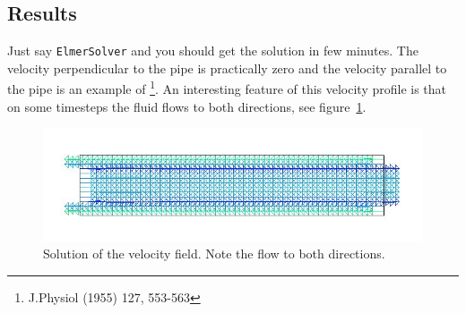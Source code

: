 \subsection*{Results}
Just say {\tt ElmerSolver} and you should get the solution in few minutes.
The velocity perpendicular to the pipe is practically zero and the velocity
parallel to the pipe is an example of 
\footnote{J.Physiol (1955) 127, 553-563}.
An interesting feature of this velocity profile is that on some timesteps 
the fluid flows to both directions, see figure~\ref{f:womersley}.
\begin{figure}[!hb]
\begin{center}
\includegraphics[width=\textwidth]{womersley}
\caption{Solution of the velocity field. Note the flow to both directions.}
\label{f:womersley}
\end{center}
\end{figure}

